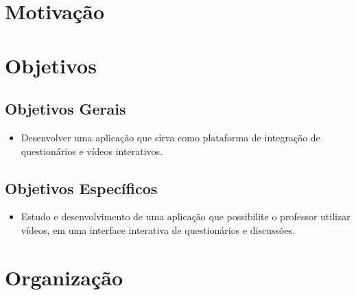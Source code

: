 \section{Motivação}
\section{Objetivos}
\subsection{Objetivos Gerais}
\begin{itemize}
  \item Desenvolver uma aplicação que sirva como plataforma de integração de questionários e vídeos interativos.
\end{itemize}
\subsection{Objetivos Específicos}
\begin{itemize}
  \item Estudo e desenvolvimento de uma aplicação que possibilite o professor utilizar vídeos, em uma interface interativa de questionários e discussões.
\end{itemize}
\section{Organização}
